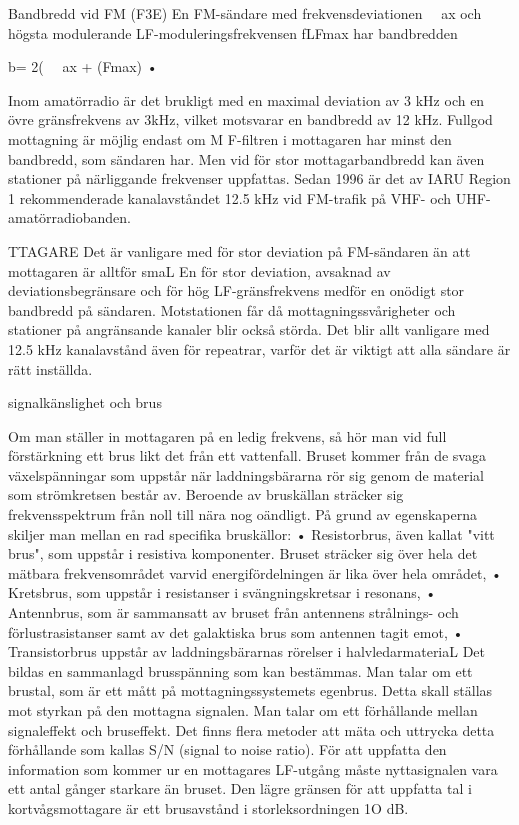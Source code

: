 \documentclass[a4paper,twoside,twocolumn,openright]{book}
\begin{document}
{{{Bandbredd vid FM (F3E)
En FM-sändare med frekvensdeviationen
~~ax och högsta modulerande LF-moduleringsfrekvensen fLFmax har bandbredden

b= 2( ~~ax + (Fmax) •

Inom amatörradio är det brukligt med en
maximal deviation av 3 kHz och en övre
gränsfrekvens av 3kHz, vilket motsvarar en
bandbredd av 12 kHz.
Fullgod mottagning är möjlig endast om
M F-filtren i mottagaren har minst den bandbredd, som sändaren har. Men vid för stor
mottagarbandbredd kan även stationer på
närliggande frekvenser uppfattas. Sedan
1996 är det av IARU Region 1 rekommenderade kanalavståndet 12.5 kHz vid FM-trafik
på VHF- och UHF-amatörradiobanden.

TTAGARE
Det är vanligare med för stor deviation på
FM-sändaren än att mottagaren är alltför
smaL En för stor deviation, avsaknad av
deviationsbegränsare och för hög LF-gränsfrekvens medför en onödigt stor bandbredd
på sändaren. Motstationen får då mottagningssvårigheter och stationer på angränsande kanaler blir också störda.
Det blir allt vanligare med 12.5 kHz kanalavstånd även för repeatrar, varför det är
viktigt att alla sändare är rätt inställda.

signalkänslighet och brus

Om man ställer in mottagaren på en ledig
frekvens, så hör man vid full förstärkning ett
brus likt det från ett vattenfall.
Bruset kommer från de svaga växelspänningar som uppstår när laddningsbärarna
rör sig genom de material som strömkretsen
består av. Beroende av bruskällan sträcker
sig frekvensspektrum från noll till nära nog
oändligt. På grund av egenskaperna skiljer
man mellan en rad specifika bruskällor:
• Resistorbrus, även kallat "vitt brus", som
uppstår i resistiva komponenter. Bruset
sträcker sig över hela det mätbara frekvensområdet varvid energifördelningen
är lika över hela området,
• Kretsbrus, som uppstår i resistanser i
svängningskretsar i resonans,
• Antennbrus, som är sammansatt av
bruset från antennens strålnings- och
förlustrasistanser samt av det galaktiska
brus som antennen tagit emot,
• Transistorbrus uppstår av laddningsbärarnas rörelser i halvledarmateriaL
Det bildas en sammanlagd brusspänning
som kan bestämmas. Man talar om ett brustal, som är ett mått på mottagningssystemets
egenbrus. Detta skall ställas mot styrkan på
den mottagna signalen. Man talar om ett
förhållande mellan signaleffekt och bruseffekt. Det finns flera metoder att mäta och
uttrycka detta förhållande som kallas S/N
(signal to noise ratio). För att uppfatta den
information som kommer ur en mottagares
LF-utgång måste nyttasignalen vara ett antal gånger starkare än bruset. Den lägre
gränsen för att uppfatta tal i kortvågsmottagare är ett brusavstånd i storleksordningen 1O dB.

}}}
\end{document}
